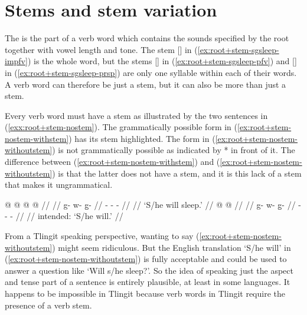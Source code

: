 \section{Stems and stem variation}\label{sec:root+stem-stems}

The  is the part of a verb word which contains the sounds specified by the root together with vowel length and tone.
The stem [] in (\ref{ex:root+stem-sgsleep-impfv}) is the whole word, but the stems [] in (\ref{ex:root+stem-sgsleep-pfv}) and [] in (\ref{ex:root+stem-sgsleep-prsp}) are only one syllable within each of their words.
A verb word can therefore be just a stem, but it can also be more than just a stem.

Every verb word must have a stem as illustrated  by the two sentences in (\ref{exx:root+stem-nostem}).
The grammatically possible form in (\ref{ex:root+stem-nostem-withstem}) has its stem highlighted.
The form in (\ref{ex:root+stem-nostem-withoutstem}) is not grammatically possible as indicated by * in front of it. The difference between (\ref{ex:root+stem-nostem-withstem}) and (\ref{ex:root+stem-nostem-withoutstem}) is that the latter does not have a stem, and it is this lack of a stem that makes it ungrammatical.

\pex\label{exx:root+stem-nostem}%
\a\label{ex:root+stem-nostem-withstem}%
%
\begingl
	\gla	{} @ {} @ {} @ {} @ {} //
	\glp	\llap{[}\rlap{\ipa{kʷùː.qà.ˈ\gm{tʰàː}}]} {} {} {} {} //
	\glb	g- w- g̱-   //
	\glc	{}- - -   //
	\gld	{} {} {} {} {} //
	\glft	‘S/he will sleep.’
		//
\endgl
\a\label{ex:root+stem-nostem-withoutstem}%
\ljudge{*}%
%
\begingl
	\gla	{} @ {} @ {} //
	\glp	\llap{[}\rlap{\ipa{kʷùː.qà}]} {} {} //
	\glb	g- w- g̱- //
	\glc	{}- - - //
	\gld	{} {} {} //
	\glft	intended: ‘S/he will.’
		//
\endgl
\xe

From a Tlingit speaking perspective, wanting to say (\ref{ex:root+stem-nostem-withoutstem}) might seem ridiculous.
But the English translation ‘S/he will’ in (\ref{ex:root+stem-nostem-withoutstem}) is fully acceptable and could be used to answer a question like ‘Will s/he sleep?’.
So the idea of speaking just the aspect and tense part of a sentence is entirely plausible, at least in some languages.
It happens to be impossible in Tlingit because verb words in Tlingit require the presence of a verb stem.

